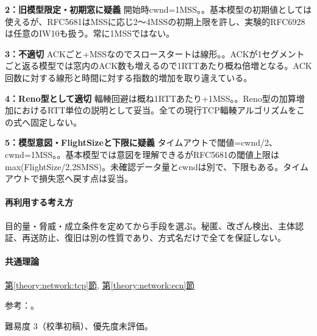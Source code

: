 \noindent\textbf{2：旧模型限定・初期窓に疑義} 開始時cwnd=\allowbreak{}1MSS。。基本模型の初期値としては使えるが、RFC5681はMSSに応じ2〜4MSSの初期上限を許し、実験的RFC6928は任意のIW10も扱う。常に1MSSではない。\par

\noindent\textbf{3：不適切} ACKごと+MSSなのでスロースタートは線形。。ACKが1セグメントごと返る模型では窓内のACK数も増えるので1RTTあたり概ね倍増となる。ACK回数に対する線形と時間に対する指数的増加を取り違えている。\par

\noindent\textbf{4：Reno型として適切} 輻輳回避は概ね1RTTあたり+1MSS。。Reno型の加算増加におけるRTT単位の説明として妥当。全ての現行TCP輻輳アルゴリズムをこの式へ固定しない。\par

\noindent\textbf{5：模型意図・FlightSizeと下限に疑義} タイムアウトで閾値=cwnd/2、cwnd=\allowbreak{}1MSS。。基本模型では意図を理解できるがRFC5681の閾値上限はmax(FlightSize/2,2SMSS)。未確認データ量とcwndは別で、下限もある。タイムアウトで損失窓へ戻す点は妥当。\par

\paragraph{再利用する考え方} 目的量・脅威・成立条件を定めてから手段を選ぶ。秘匿、改ざん検出、主体認証、再送防止、復旧は別の性質であり、方式名だけで全てを保証しない。

\paragraph{共通理論} \hyperref[theory:network:tcp]{第\ref*{theory:network:tcp}節}, \hyperref[theory:network:ecn]{第\ref*{theory:network:ecn}節}

\par 参考：\cite{net_tcp2009,net_ecn2001,net_iw2013}。

\par 難易度 3（校準初稿）、優先度未評価。
